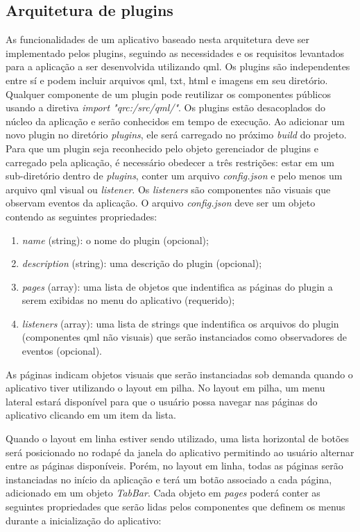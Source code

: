 \subsection{Arquitetura de plugins}
As funcionalidades de um aplicativo baseado nesta arquitetura deve ser implementado pelos plugins, seguindo as necessidades e os requisitos levantados para a aplicação a ser desenvolvida utilizando qml. Os plugins são independentes entre sí e podem incluir arquivos qml, txt, html e imagens em seu diretório. Qualquer componente de um plugin pode reutilizar os componentes públicos usando a diretiva \textit{import "qrc:/src/qml/"}. Os plugins estão desacoplados do núcleo da aplicação e serão conhecidos em tempo de execução. Ao adicionar um novo plugin no diretório \textit{plugins}, ele será carregado no próximo \textit{build} do projeto. Para que um plugin seja reconhecido pelo objeto gerenciador de plugins e carregado pela aplicação, é necessário obedecer a três restrições: estar em um sub-diretório dentro de \textit{plugins}, conter um arquivo \textit{config.json} e pelo menos um arquivo qml visual ou \textit{listener}. Os \textit{listeners} são componentes não visuais que observam eventos da aplicação. O arquivo \textit{config.json} deve ser um objeto contendo as seguintes propriedades:  
\begin{enumerate}
	\item \textit{name} (string): o nome do plugin (opcional);

	\item \textit{description} (string): uma descrição do plugin (opcional);

	\item \textit{pages} (array): uma lista de objetos que indentifica as páginas do plugin a serem exibidas no menu do aplicativo (requerido);

	\item \textit{listeners} (array): uma lista de strings que indentifica os arquivos do plugin (componentes qml não visuais) que serão instanciados como observadores de eventos (opcional).
\end{enumerate}

As páginas indicam objetos visuais que serão instanciadas sob demanda quando o aplicativo tiver utilizando o layout em pilha. No layout em pilha, um menu lateral estará disponível para que o usuário possa navegar nas páginas do aplicativo clicando em um item da lista.\par

Quando o layout em linha estiver sendo utilizado, uma lista horizontal de botões será posicionado no rodapé da janela do aplicativo permitindo ao usuário alternar entre as páginas disponíveis. Porém, no layout em linha, todas as páginas serão instanciadas no início da aplicação e terá um botão associado a cada página, adicionado em um objeto \textit{TabBar}. Cada objeto em \textit{pages} poderá conter as seguintes propriedades que serão lidas pelos componentes que definem os menus durante a inicialização do aplicativo:

